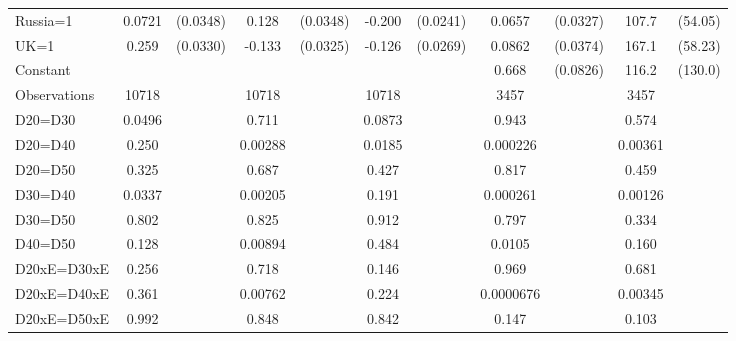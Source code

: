 \begin{tabular}{l|cccccc|cc|cc}
Russia=1        &   0.0721\sym{**} & (0.0348)&    0.128\sym{***}& (0.0348)&   -0.200\sym{***}& (0.0241)&   0.0657\sym{**} & (0.0327)&    107.7\sym{**} &  (54.05)\\
UK=1            &    0.259\sym{***}& (0.0330)&   -0.133\sym{***}& (0.0325)&   -0.126\sym{***}& (0.0269)&   0.0862\sym{**} & (0.0374)&    167.1\sym{***}&  (58.23)\\
Constant        &                  &         &                  &         &                  &         &    0.668\sym{***}& (0.0826)&    116.2         &  (130.0)\\
\hline
Observations    &    10718         &         &    10718         &         &    10718         &         &     3457         &         &     3457         &         \\
D20=D30         &   0.0496         &         &    0.711         &         &   0.0873         &         &    0.943         &         &    0.574         &         \\
D20=D40         &    0.250         &         &  0.00288         &         &   0.0185         &         & 0.000226         &         &  0.00361         &         \\
D20=D50         &    0.325         &         &    0.687         &         &    0.427         &         &    0.817         &         &    0.459         &         \\
D30=D40         &   0.0337         &         &  0.00205         &         &    0.191         &         & 0.000261         &         &  0.00126         &         \\
D30=D50         &    0.802         &         &    0.825         &         &    0.912         &         &    0.797         &         &    0.334         &         \\
D40=D50         &    0.128         &         &  0.00894         &         &    0.484         &         &   0.0105         &         &    0.160         &         \\
D20xE=D30xE     &    0.256         &         &    0.718         &         &    0.146         &         &    0.969         &         &    0.681         &         \\
D20xE=D40xE     &    0.361         &         &  0.00762         &         &    0.224         &         &0.0000676         &         &  0.00345         &         \\
D20xE=D50xE     &    0.992         &         &    0.848         &         &    0.842         &         &    0.147         &         &    0.103         &         \\

\end{tabular}

